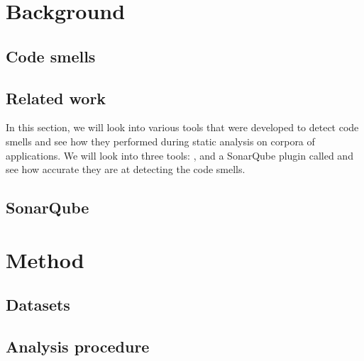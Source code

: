 \documentclass[12pt]{article}
\begin{document}
    \newpage

    \section{Background}\label{sec:background}

    \subsection{Code smells}\label{subsec:code-smells}

    

    \subsection{Related work}\label{subsec:related-work}

    In this section, we will look into various tools that were developed to detect code smells
    and see how they performed during static analysis on corpora of applications.
    We will look into three tools: ,  and a SonarQube plugin called
     and see how accurate they are at detecting the code smells.

    

    \subsection{SonarQube}\label{subsec:sonarqube}

    

    \newpage

    \section{Method}\label{sec:method}

    

    \subsection{Datasets}\label{subsec:datasets}

    

    \subsection{Analysis procedure}\label{subsec:analysis-procedure}
\end{document}
